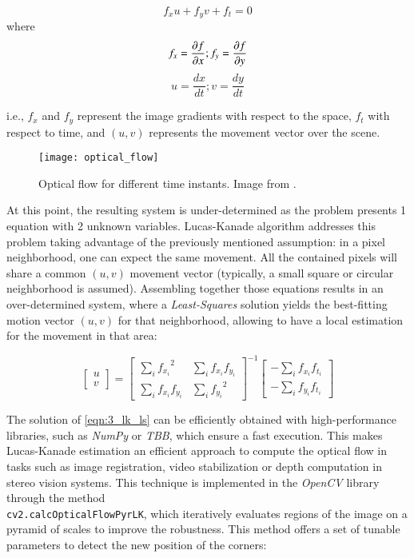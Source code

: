$$
f_xu+ f_yv + f_t = 0
$$
where
$$
f_x = \frac{\partial f}{\partial x} ; f_y = \frac{\partial f}{\partial y}\\
$$
$$
u = \frac{dx}{dt} ; v = \frac{dy}{dt}
$$

i.e., $f_x$ and $f_y$ represent the image gradients with respect to the space,  $f_t$ with respect to time, and $(u, v)$ represents the movement vector over the scene.

\begin{figure}[h]
	\centering
	\texttt{[image: optical\_flow]}
	\caption{Optical flow for different time instants. Image from \cite{lucas_kanade_tutorial}.}
	\label{fig:3_optical_flow}
\end{figure}

At this point, the resulting system is under-determined as the problem presents 1 equation with 2 unknown variables. Lucas-Kanade algorithm addresses this problem taking advantage of the previously mentioned assumption: in a pixel neighborhood, one can expect the same movement. All the contained pixels will share a common $(u, v)$ movement vector (typically, a small square or circular neighborhood is assumed). Assembling together those equations results in an over-determined system, where a \textit{Least-Squares} solution yields the best-fitting motion vector $(u,v)$ for that neighborhood, allowing to have a local estimation for the movement in that area:

\begin{equation}
\begin{bmatrix} u \\ v \end{bmatrix} = \begin{bmatrix} \sum_{i}{f_{x_i}}^2 & \sum_{i}{f_{x_i} f_{y_i} } \\ \sum_{i}{f_{x_i} f_{y_i}} & \sum_{i}{f_{y_i}}^2 \end{bmatrix}^{-1} \begin{bmatrix} - \sum_{i}{f_{x_i} f_{t_i}} \\ - \sum_{i}{f_{y_i} f_{t_i}} \end{bmatrix}
\label{eqn:3_lk_ls}
\end{equation}

The solution of \autoref{eqn:3_lk_ls} can be efficiently obtained with high-performance libraries, such as \textit{NumPy} or \textit{TBB}, which ensure a fast execution. This makes Lucas-Kanade estimation an efficient approach to compute the optical flow in tasks such as image registration, video stabilization or depth computation in stereo vision systems. This technique is implemented in the \textit{OpenCV} library through the method\\ \texttt{cv2.calcOpticalFlowPyrLK}, which iteratively evaluates regions of the image on a pyramid of scales to improve the robustness. This method offers a set of tunable parameters to detect the new position of the corners:


